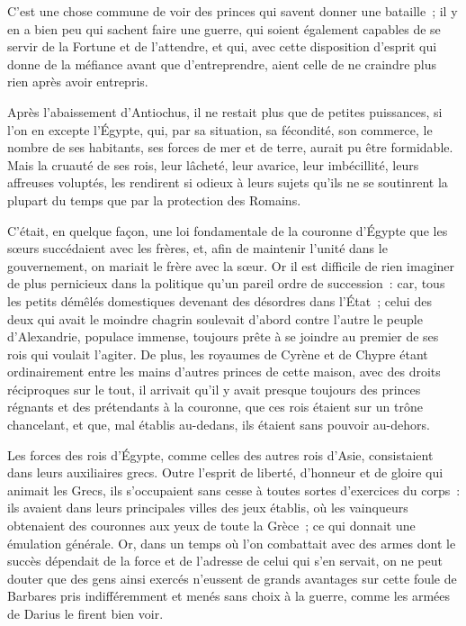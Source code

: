 \documentclass[french,twoside]{book} %
\begin{document}
C’est une chose commune de voir des princes qui savent donner une bataille ; il y en a bien peu qui sachent faire une guerre, qui soient également capables de se servir de la Fortune et de l’attendre, et qui, avec cette disposition d’esprit qui donne de la méfiance avant que d’entreprendre, aient celle de ne craindre plus rien après avoir entrepris.\par
Après l’abaissement d’Antiochus, il ne restait plus que de petites puissances, si l’on en excepte l’Égypte, qui, par sa situation, sa fécondité, son commerce, le nombre de ses habitants, ses forces de mer et de terre, aurait pu être formidable. Mais la cruauté de ses rois, leur lâcheté, leur avarice, leur imbécillité, leurs affreuses voluptés, les rendirent si odieux à leurs sujets qu’ils ne se soutinrent la plupart du temps que par la protection des Romains.\par
C’était, en quelque façon, une loi fondamentale de la couronne d’Égypte que les sœurs succédaient avec les frères, et, afin de maintenir l’unité dans le gouvernement, on mariait le frère avec la sœur. Or il est difficile de rien imaginer de plus pernicieux dans la politique qu’un pareil ordre de succession : car, tous les petits démêlés domestiques devenant des désordres dans l’État ; celui des deux qui avait le moindre chagrin soulevait d’abord contre l’autre le peuple d’Alexandrie, populace immense, toujours prête à se joindre au premier de ses rois qui voulait l’agiter. De plus, les royaumes de Cyrène et de Chypre étant ordinairement entre les mains d’autres princes de cette maison, avec des droits réciproques sur le tout, il arrivait qu’il y avait presque toujours des princes régnants et des prétendants à la couronne, que ces rois étaient sur un trône chancelant, et que, mal établis au-dedans, ils étaient sans pouvoir au-dehors.\par
Les forces des rois d’Égypte, comme celles des autres rois d’Asie, consistaient dans leurs auxiliaires grecs. Outre l’esprit de liberté, d’honneur et de gloire qui animait les Grecs, ils s’occupaient sans cesse à toutes sortes d’exercices du corps : ils avaient dans leurs principales villes des jeux établis, où les vainqueurs obtenaient des couronnes aux yeux de toute la Grèce ; ce qui donnait une émulation générale. Or, dans un temps où l’on combattait avec des armes dont le succès dépendait de la force et de l’adresse de celui qui s’en servait, on ne peut douter que des gens ainsi exercés n’eussent de grands avantages sur cette foule de Barbares pris indifféremment et menés sans choix à la guerre, comme les armées de Darius le firent bien voir.\par
\end{document}
